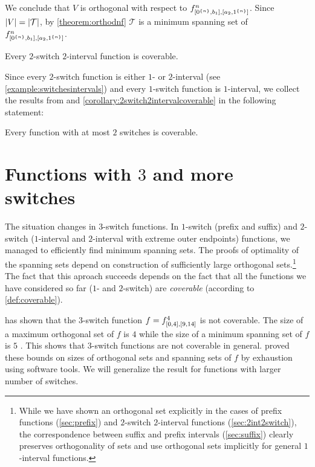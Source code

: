 We conclude that $V$ is orthogonal
with respect to $f^{n}_{[0^{\{n\}}, b_1], [a_2, 1^{\{n\}}]}$.
Since $\lvert V\rvert = \lvert\mathcal{T}\rvert$,
by \cref{theorem:orthodnf} $\mathcal{T}$
is a minimum spanning set of $f^{n}_{[0^{\{n\}}, b_1], [a_2, 1^{\{n\}}]}$.

\begin{corollary}
\label{corollary:2switch2intervalcoverable}
Every $2$-switch $2$-interval function is coverable.
\end{corollary}

Since every $2$-switch function is either $1$- or $2$-interval (see \cref{example:switchesintervals})
and every $1$-switch function is $1$-interval,
we collect the results from 
and \cref{corollary:2switch2intervalcoverable}
in the following statement:
\begin{corollary}
Every function with at most $2$ switches is coverable.
\end{corollary}

\section{Functions with \texorpdfstring{$3$}{3}
and more switches}
\label{sec:3switch}

The situation changes in $3$-switch functions.
In $1$-switch (prefix and suffix)
and $2$-switch ($1$-interval and $2$-interval
with extreme outer endpoints)
functions,
we managed to efficiently find minimum spanning sets.
The proofs of optimality of the spanning sets
depend on construction of sufficiently large
orthogonal sets.\footnote{While we have shown
an orthogonal set explicitly
in the cases of prefix functions (\cref{sec:prefix})
and $2$-switch $2$-interval functions (\cref{sec:2int2switch}),
the correspondence between suffix and prefix intervals
(\cref{sec:suffix})
clearly preserves orthogonality of sets
and \citet{Schieber2005154}
use orthogonal sets implicitly
for general $1$-interval functions.}
The fact that this aproach succeeds
depends on the fact that all the functions we have considered so far ($1$- and $2$-switch)
are \emph{coverable}
(according to \cref{def:coverable}).

\citeauthor{Dubovsky2012} has shown that
the $3$-switch function
$f = f^{4}_{[0, 4], [9, 14]}$ is not coverable.
The size of a maximum orthogonal set of $f$ is $4$
while the size of a minimum spanning set of $f$ is $5$
\citep[p.~32]{Dubovsky2012}.
This shows that $3$-switch functions are not coverable in general.
\citeauthor{Dubovsky2012} proved these bounds
on sizes of orthogonal sets and spanning sets of $f$
by exhaustion using software tools.
We will generalize the result for functions
with larger number of switches.

